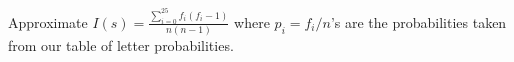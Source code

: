 Approximate $I(s) = \frac{\sum_{i=0}^{25}f_i(f_i-1)}{n(n-1)}$
where $p_i = f_i/n$'s are the probabilities taken from our
table of
letter probabilities.
